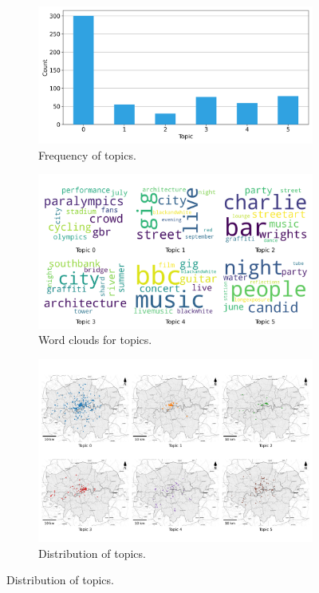 \documentclass{article}
\theoremstyle{remark}
\begin{document}
\begin{figure}[!h]
    \centering
    \begin{subfigure}{0.45\textwidth}
        \centering
        \includegraphics[width=\linewidth]{figures/places_sense_nighttime_locals.png} 
        \caption{Frequency of topics.}
        \label{fig:places_sense_nighttime_locals}
    \end{subfigure}
    \hfill
    \begin{subfigure}{0.5\textwidth}
        \centering
        \includegraphics[width=\linewidth]{figures/topics_nighttime_locals.png} 
        \caption{Word clouds for topics.}
        \label{fig:topics_nighttime_locals}
    \end{subfigure}
    
    \begin{subfigure}{0.9\textwidth}
        \centering
        \includegraphics[width=\linewidth]{figures/topics_distribution_nighttime_locals.png} 
        \caption{Distribution of topics.}
        \label{fig:topics_distribution_nighttime_locals}
    \end{subfigure}


\end{figure}
\end{document}
